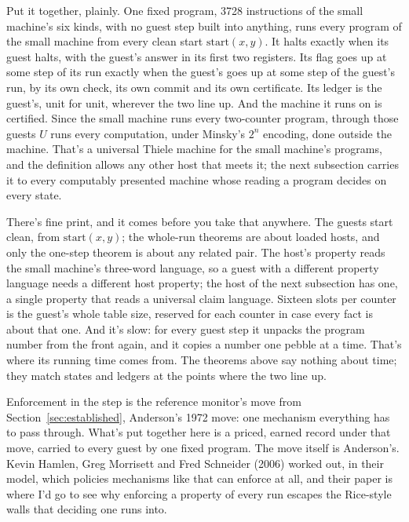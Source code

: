 \documentclass[11pt,twoside]{article}
\theoremstyle{thielethm}
\theoremstyle{thieledef}
\theoremstyle{thieledef}
\theoremstyle{thieledef}
\theoremstyle{thielethm}
\theoremstyle{thieleobs}
\theoremstyle{thielethm}
\begin{document}
Put it together, plainly. One fixed program, 3728 instructions of the small machine's six kinds,
with no guest step built into anything, runs every program of the small machine from every clean start $\mathrm{start}(x, y)$.
It halts exactly when its guest halts, with the guest's answer in its first two registers. Its
flag goes up at some step of its run exactly when the guest's goes up at some step of the guest's run, by its own check, its own commit and its own
certificate. Its ledger is the guest's, unit for unit, wherever the two line up. And the machine
it runs on is certified. Since the small machine runs every two-counter program, through
those guests $U$ runs every computation, under Minsky's $2^n$ encoding, done outside the machine. That's a universal Thiele machine for the small machine's
programs, and the definition allows any other host that meets it; the next subsection carries it to every computably presented machine whose
reading a program decides on every state.

There's fine print, and it comes before you take that anywhere. The guests start clean, from $\mathrm{start}(x,
y)$; the whole-run theorems are about loaded hosts, and only the one-step theorem is about any
related pair. The host's property reads the small machine's three-word language, so a guest with
a different property language needs a different host property; the host of the next subsection
has one, a single property that reads a universal claim language. Sixteen slots per counter is
the guest's whole table size, reserved for each counter in case every fact is about that one.
And it's slow: for every guest step it unpacks the program number from the front again,
and it copies a number one pebble at a time. That's where its running time comes from. The theorems above say nothing about time; they match
states and ledgers at the points where the two line up.

Enforcement in the step is the reference monitor's move from Section~\ref{sec:established}, Anderson's 1972
move: one mechanism everything has to pass through. What's put together here is a priced, earned
record under that move, carried to every guest by one fixed program. The move itself is
Anderson's. Kevin Hamlen, Greg Morrisett and Fred Schneider (2006) worked out, in their model, which policies
mechanisms like
that can enforce at all, and their paper is where I'd go to see why
enforcing a property of every run escapes the Rice-style walls that deciding one runs into.
\end{document}
